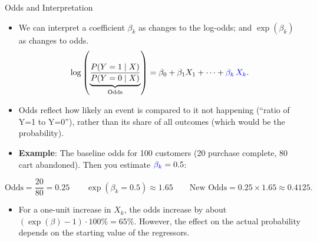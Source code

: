 \documentclass[
  10pt,
  ignorenonframetext,
]{beamer}
\providecommand{\tightlist}{%
  \setlength{\itemsep}{0pt}\setlength{\parskip}{0pt}}\usepackage{longtable,booktabs,array}
\begin{document}
\begin{frame}{Odds and Interpretation}
\label{odds-and-interpretation}
\small

\begin{itemize}
\item
  We can interpret a coefficient \(\beta_k\) as changes to the log-odds;
  and \(\exp(\beta_k)\) as changes to odds. \[
  \log\left(\underbrace{\frac{P(Y = 1 \mid X)}{P(Y = 0 \mid X)}}_{\text{Odds}}\right) = \beta_0 + \beta_1 X_1 + \dots + \textcolor{blue}{\beta_k}\,\textcolor{blue}{X_k}.
  \]
\item
  Odds reflect how likely an event is compared to it not happening
  (``ratio of Y=1 to Y=0''), rather than its share of all outcomes
  (which would be the probability).
\item
  \textbf{Example}: The baseline odds for 100 customers (20 purchase
  complete, 80 cart abandoned). Then you estimate
  \(\textcolor{blue}{\beta_k} = 0.5\):
\end{itemize}

\[
  \text{Odds} = \frac{20}{80} = 0.25 \quad\quad \exp(\beta_k = 0.5) \approx 1.65 \quad\quad \text{New Odds} = 0.25 \times 1.65 \approx 0.4125.
\]

\begin{itemize}
\tightlist
\item
  For a one-unit increase in \(X_k\), the odds increase by about
  \((\exp(\beta) - 1) \cdot 100 \% = 65\%\). However, the effect on the
  actual probability depends on the starting value of the regressors.
\end{itemize}
\end{frame}
\end{document}
